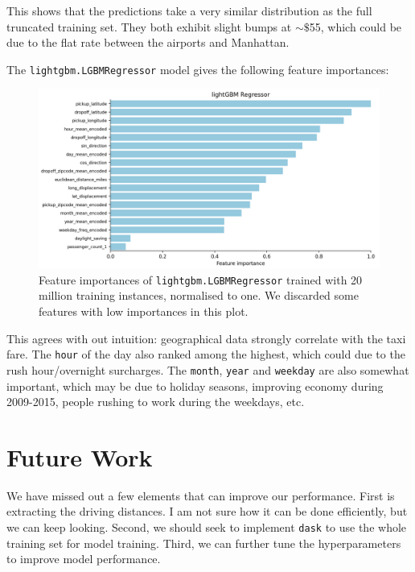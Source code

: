 \documentclass[12pt,letterpaper,final]{article}
\numberwithin{equation}{section}
\begin{document}
This shows that the predictions take a very similar distribution as the full truncated training set. They both exhibit slight bumps at $\sim\$$55, which could be due to the flat rate between the airports and Manhattan.

The \texttt{lightgbm.LGBMRegressor} model gives the following feature importances:

\begin{figure}[H]
\begin{center}
\includegraphics[width=0.9\linewidth,keepaspectratio]{plots/lightgbm_feature_importances20M.png}
\caption{Feature importances of \texttt{lightgbm.LGBMRegressor} trained with 20 million training instances, normalised to one. We discarded some features with low importances in this plot.}\label{featimp}
\end{center}
\end{figure}

This agrees with out intuition: geographical data strongly correlate with the taxi fare. The \verb|hour| of the day also ranked among the highest, which could due to the rush hour/overnight surcharges. The \verb|month|, \verb|year| and \verb|weekday| are also somewhat important, which may be due to holiday seasons, improving economy during 2009-2015, people rushing to work during the weekdays, etc.

\section{Future Work}

We have missed out a few elements that can improve our performance. First is extracting the driving distances. I am not sure how it can be done efficiently, but we can keep looking. Second, we should seek to implement \verb|dask| to use the whole training set for model training. Third, we can further tune the hyperparameters to improve model performance.
\end{document}
